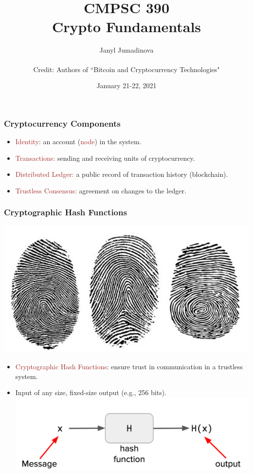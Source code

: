 \documentclass{beamer}
\title{CMPSC 390 \\ Crypto Fundamentals }
\author{Janyl Jumadinova \\ $ $ \\ Credit: Authors of ``Bitcoin and Cryptocurrency Technologies"}
\date{January 21-22, 2021}
\begin{document}
\begin{frame}
  \titlepage
\end{frame}

\begin{frame}
  \frametitle{Cryptocurrency Components}
	\begin{itemize}
		\item \textcolor{brown}{Identity}:  an account (\textcolor{brown}{node}) in the system.
		\item \textcolor{brown}{Transactions:} sending and receiving  units of cryptocurrency.
		\item \textcolor{brown}{Distributed Ledger:} a public record of transaction history (blockchain).
		\item \textcolor{brown}{Trustless Consensus:} agreement on changes to the ledger.
	\end{itemize}
\end{frame}
\begin{frame}
  \frametitle{Cryptographic Hash Functions}
  
	\includegraphics[scale=0.3]{fingers}
	\begin{itemize}
		\item \textcolor{brown}{Cryptographic Hash Functions}:  ensure trust in communication in a trustless system. \pause
		\item Input of any size, fixed-size output (e.g., 256 bits).
	\includegraphics[scale=0.5]{hash}
	\end{itemize}
\end{frame}
\end{document}
